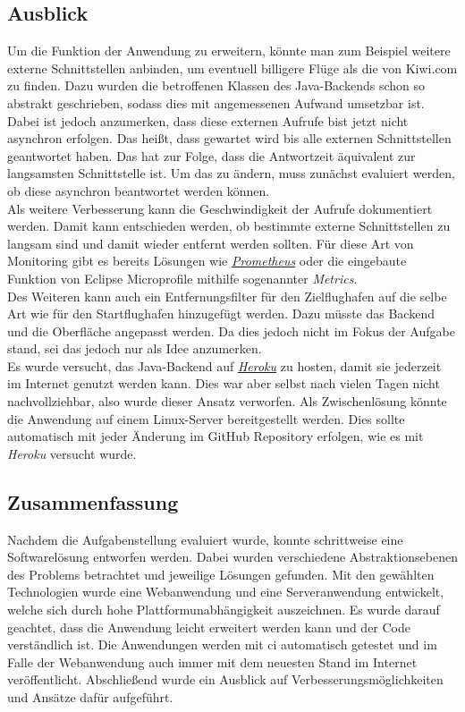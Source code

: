 \documentclass[12pt,twoside,a4paper]{article}
\begin{document}
\begin{sloppypar}
\subsection{Ausblick}
Um die Funktion der Anwendung zu erweitern, könnte man zum Beispiel weitere externe Schnittstellen anbinden, um eventuell billigere Flüge als die von Kiwi.com zu finden. Dazu wurden die betroffenen Klassen des Java-Backends schon so abstrakt geschrieben, sodass dies mit angemessenen Aufwand umsetzbar ist.\\
Dabei ist jedoch anzumerken, dass diese externen Aufrufe bist jetzt nicht asynchron erfolgen. Das heißt, dass gewartet wird bis alle externen Schnittstellen geantwortet haben. Das hat zur Folge, dass die Antwortzeit äquivalent zur langsamsten Schnittstelle ist. Um das zu ändern, muss zunächst evaluiert werden, ob diese asynchron beantwortet werden können.\\
Als weitere Verbesserung kann die Geschwindigkeit der Aufrufe dokumentiert werden. Damit kann entschieden werden, ob bestimmte externe Schnittstellen zu langsam sind und damit wieder entfernt werden sollten. Für diese Art von Monitoring gibt es bereits Lösungen wie \href{https://prometheus.io/}{\textit{Prometheus}} oder die eingebaute Funktion von Eclipse Microprofile mithilfe sogenannter \textit{Metrics}.\\
Des Weiteren kann auch ein Entfernungsfilter für den Zielflughafen auf die selbe Art wie für den Startflughafen hinzugefügt werden. Dazu müsste das Backend und die Oberfläche angepasst werden. Da dies jedoch nicht im Fokus der Aufgabe stand, sei das jedoch nur als Idee anzumerken.\\
Es wurde versucht, das Java-Backend auf \href{https://www.heroku.com/}{\textit{Heroku}} zu hosten, damit sie jederzeit im Internet genutzt werden kann. Dies war aber selbst nach vielen Tagen nicht nachvollziehbar, also wurde dieser Ansatz verworfen. Als Zwischenlösung könnte die Anwendung auf einem Linux-Server bereitgestellt werden. Dies sollte automatisch mit jeder Änderung im GitHub Repository erfolgen, wie es mit \textit{Heroku} versucht wurde.
\subsection{Zusammenfassung}
Nachdem die Aufgabenstellung evaluiert wurde, konnte schrittweise eine Softwarelösung entworfen werden. Dabei wurden verschiedene Abstraktionsebenen des Problems betrachtet und jeweilige Lösungen gefunden. Mit den gewählten Technologien wurde eine Webanwendung und eine Serveranwendung entwickelt, welche sich durch hohe Plattformunabhängigkeit auszeichnen. Es wurde darauf geachtet, dass die Anwendung leicht erweitert werden kann und der Code verständlich ist. Die Anwendungen werden mit \acrfull{ci} automatisch getestet und im Falle der Webanwendung auch immer mit dem neuesten Stand im Internet veröffentlicht. Abschließend wurde ein Ausblick auf Verbesserungsmöglichkeiten und Ansätze dafür aufgeführt.
\end{sloppypar}
\newpage


\end{document}
